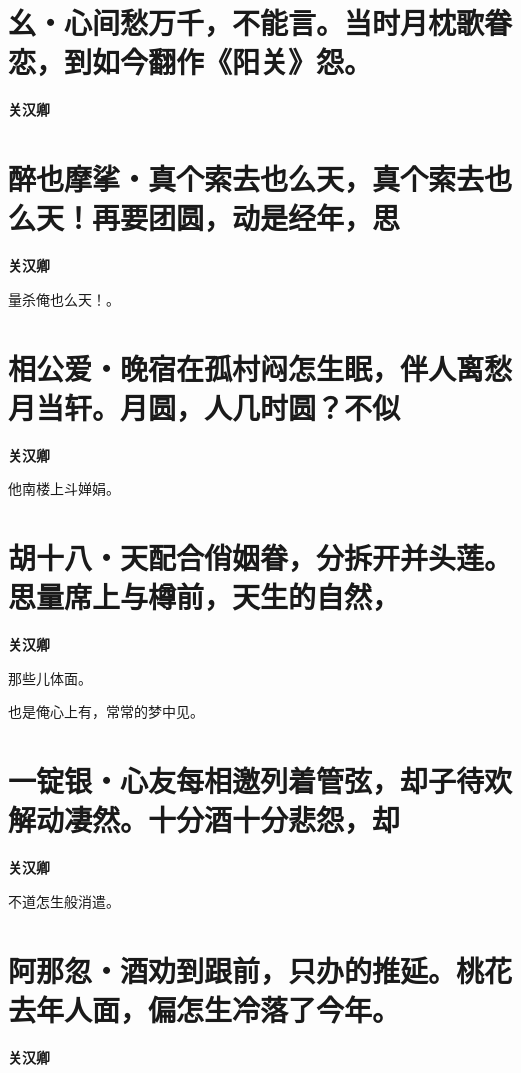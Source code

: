 \documentclass[12pt,a4paper]{ctexbook}
\begin{document}
\section{幺・心间愁万千，不能言。当时月枕歌眷恋，到如今翻作《阳关》怨。}
\textbf{关汉卿}\par\vspace{0.5em}

\section{醉也摩挲・真个索去也么天，真个索去也么天！再要团圆，动是经年，思}
\textbf{关汉卿}\par\vspace{0.5em}
量杀俺也么天！。\par

\section{相公爱・晚宿在孤村闷怎生眠，伴人离愁月当轩。月圆，人几时圆？不似}
\textbf{关汉卿}\par\vspace{0.5em}
他南楼上斗婵娟。\par

\section{胡十八・天配合俏姻眷，分拆开并头莲。思量席上与樽前，天生的自然，}
\textbf{关汉卿}\par\vspace{0.5em}
那些儿体面。\par
也是俺心上有，常常的梦中见。\par

\section{一锭银・心友每相邀列着管弦，却子待欢解动凄然。十分酒十分悲怨，却}
\textbf{关汉卿}\par\vspace{0.5em}
不道怎生般消遣。\par

\section{阿那忽・酒劝到跟前，只办的推延。桃花去年人面，偏怎生冷落了今年。}
\textbf{关汉卿}\par\vspace{0.5em}
\end{document}
